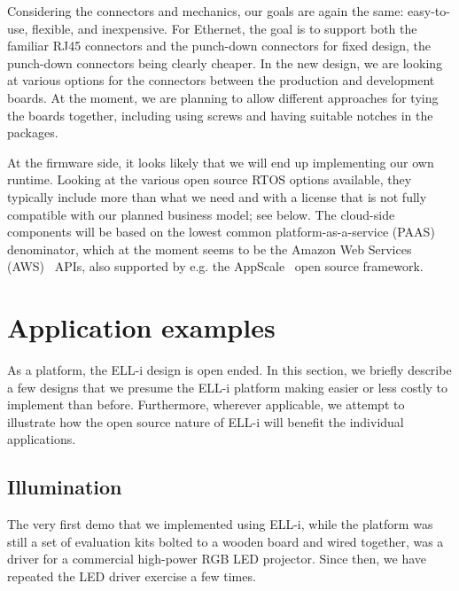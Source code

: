 \documentclass[final]{siamltex}
\begin{document}
Considering the connectors and mechanics, our goals are again the
same: easy-to-use, flexible, and inexpensive.  For Ethernet, the goal
is to support both the familiar RJ45 connectors and the punch-down
connectors for fixed design, the punch-down connectors being clearly
cheaper.  In the new design, we are looking at various options for the
connectors between the production and development boards.  At the
moment, we are planning to allow different approaches for tying the
boards together, including using screws and having suitable notches in
the packages.

At the firmware side, it looks likely that we will end up implementing
our own runtime.  Looking at the various open source RTOS options
available, they typically include more than what we need and with a
license that is not fully compatible with our planned business model;
see below.  The cloud-side components will be based on the lowest
common platform-as-a-service (PAAS) denominator, which at the moment
seems to be the Amazon Web Services (AWS)~\cite{AWS} APIs, also supported by
e.g. the AppScale~\cite{AppScale} open source framework.


\section{Application examples}
\label{sec:examples}

As a platform, the ELL-i design is open ended.  In this section, we
briefly describe a few designs that we presume the ELL-i platform
making easier or less costly to implement than before.  Furthermore,
wherever applicable, we attempt to illustrate how the open source
nature of ELL-i will benefit the individual applications.

\subsection{Illumination}

The very first demo that we implemented using ELL-i, while the
platform was still a set of evaluation kits bolted to a wooden board
and wired together, was a driver for a commercial high-power RGB LED
projector.  Since then, we have repeated the LED driver exercise a few
times.
\end{document}
